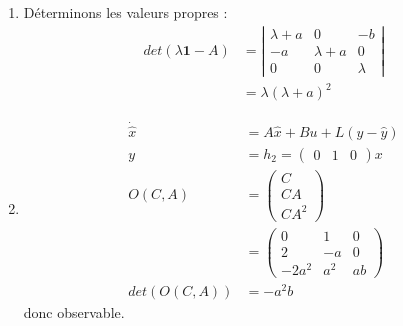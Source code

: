 \documentclass[../main.tex]{subfiles}
\begin{document}
\begin{enumerate}
\item Déterminons les valeurs propres :
\begin{align*}
det(\lambda \mathbf{1} - A) &= \left | \begin{matrix}
\lambda + a &0&-b \\ -a & \lambda + a & 0 \\ 0 & 0 & \lambda \end{matrix} \right |\\
&= \lambda(\lambda + a)^2
\end{align*}

\item
\begin{align*}
\dot{\hat{x}} &= A\hat{x} + B u + L(y-\hat{y})\\
y &= h_2 = \begin{pmatrix}0&1&0\end{pmatrix} x\\
O(C,A) &= \begin{pmatrix}C\\CA \\CA^2\end{pmatrix}\\
 &= \begin{pmatrix}0&1&0\\2&-a&0\\-2a^2&a^2&ab\end{pmatrix}\\
 det(O(C,A)) &= -a^2b
\end{align*}
 donc observable.\\


\end{enumerate}
\end{document}
